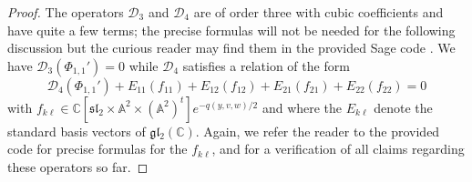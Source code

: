 \documentclass[reqno, 11pt]{amsart} %
\numberwithin{equation}{section}
\theoremstyle{plain}
\theoremstyle{definition}
\theoremstyle{remark}
\newcommand{\mbA}{\mathbb{A}}
\newcommand{\mbC}{\mathbb{C}}
\newcommand{\mcD}{\mathcal{D}}
\newcommand{\mfg}{\mathfrak{g}}
\newcommand{\mfl}{\mathfrak{l}}
\newcommand{\mfs}{\mathfrak{s}}
\newcommand{\mfgl}{\mfg\mfl}
\newcommand{\mfsl}{\mfs\mfl}
\begin{document}
\begin{proof}
The operators $\mcD_3$ and $\mcD_4$ are of order three with cubic coefficients and have quite a few terms; the precise formulas will not be needed for the following discussion but the curious reader may find them in the provided Sage code \cite{Sage}. We have $\mcD_3(Φ_{1,1}') = 0$ while $\mcD_4$ satisfies a relation of the form
\begin{equation}\label{eq:relation_D_4}
\mcD_4(Φ_{1,1}') + E_{11}(f_{11}) + E_{12}(f_{12}) + E_{21}(f_{21}) + E_{22}(f_{22}) = 0
\end{equation}
with $f_{k\ell}\in \mbC[\mfsl_2\times \mbA^2\times (\mbA^2)^t] e^{-q(y,v,w)/2}$ and where the $E_{k\ell}$ denote the standard basis vectors of $\mfgl_2(\mbC)$. Again, we refer the reader to the provided code \cite{Sage} for precise formulas for the $f_{k\ell}$, and for a verification of all claims regarding these operators so far.


\end{proof}
\end{document}
